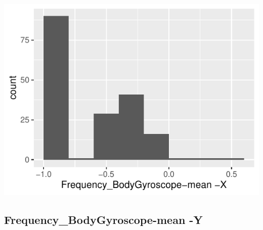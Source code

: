 \documentclass[
]{article}
\begin{document}
\begin{minipage}{0.25 \textwidth}

\includegraphics{codebook_tidydatasub_files/figure-latex/Var-61-Frequency-BodyGyroscope-mean--X-1.pdf}

\end{minipage}

\noindent\makebox[\linewidth]{\rule{\textwidth}{0.4pt}}

\hypertarget{frequency_bodygyroscope-mean--y}{%
\subsection{Frequency\_BodyGyroscope-mean
-Y}\label{frequency_bodygyroscope-mean--y}}
\end{document}
